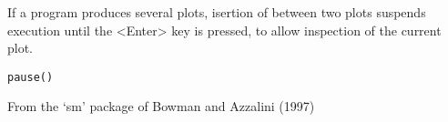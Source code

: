 \begin{Description}\relax
If a program produces several plots, isertion of  between
two plots suspends execution until the <Enter> key is pressed, to
allow inspection of the current plot.
\end{Description}
\begin{Usage}
\begin{verbatim}
pause()
\end{verbatim}
\end{Usage}
\begin{Author}\relax
From the `sm' package of Bowman and Azzalini (1997)
\end{Author}

